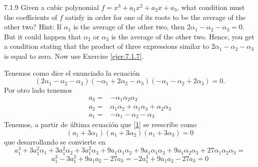 \documentclass[twoside]{article}
\begin{document}
\newpage
\begin{ejercicio}{7.1.9}
Given a cubic polynomial $f = x^3+a_1x^2+a_2x+a_3$, what condition must the coefficients
of $f$ satisfy in order for one of its roots to be the average of the other two? Hint: If $α_1$ is
the average of the other two, then $2α_1 − α_2 − α_3 = 0$. But it could happen that $α_2$ or
$α_3$ is the average of the other two. Hence, you get a condition stating that the product of
three expressions similar to $2α_1 − α_2 − α_3$ is equal to zero. Now use Exercise \ref{ejer:7.1.7}.
\end{ejercicio}
\begin{solucion}
Tenemos como dice el enunciado la ecuación
\begin{equation}\label{1}
(2α_1 − α_2 − α_3)(-α_1 + 2α_2 − α_3)(-α_1 − α_2 + 2α_3)=0.
\end{equation}
Por otro lado tenemos
\begin{align*}
a_3=&-\alpha_1\alpha_2\alpha_3\\
a_2= & \alpha_1\alpha_2+\alpha_1\alpha_3+\alpha_2\alpha_3\\
a_1=&-\alpha_1-\alpha_2-\alpha_3
\end{align*}
Tenemos, a partir de última ecuación que \ref{1} se reescribe como
\[
(a_1+3\alpha_1)(a_1+3\alpha_2)(a_1+3\alpha_3)=0
\]
que desarrollando se convierte en
\[
a_1^3 + 3a_1^2\alpha_1 + 3a_1^2\alpha_2 + 3a_1^2\alpha_3 + 9a_1\alpha_1\alpha_2+ 9a_1\alpha_1\alpha_3 + 9a_1\alpha_2\alpha_3 + 27\alpha_1\alpha_2\alpha_3=
\]
\[
a_1^3-3a_1^3+9a_1a_2-27a_3=-2a_1^3+9a_1a_2-27a_3=0
\]
\end{solucion}
\newpage
\end{document}
